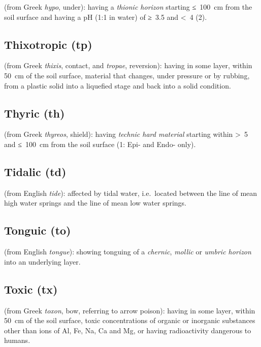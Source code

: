\documentclass[
  letterpaper,
  DIV=11,
  numbers=noendperiod]{scrreprt}
\begin{document}
(from Greek \emph{hypo}, under): having a \emph{thionic horizon}
starting ≤~100~cm from the soil surface and having a pH (1:1 in water)
of ≥~3.5 and \textless~4 (2).

\hypertarget{thixotropic-tp}{%
\subsection{Thixotropic (tp)}\label{thixotropic-tp}}

(from Greek \emph{thixis}, contact, and \emph{tropae}, reversion):
having in some layer, within 50~cm of the soil surface, material that
changes, under pressure or by rubbing, from a plastic solid into a
liquefied stage and back into a solid condition.

\hypertarget{thyric-th}{%
\subsection{Thyric (th)}\label{thyric-th}}

(from Greek \emph{thyreos}, shield): having \emph{technic hard material}
starting within \textgreater~5 and ≤~100~cm from the soil surface (1:
Epi- and Endo- only).

\hypertarget{tidalic-td}{%
\subsection{Tidalic (td)}\label{tidalic-td}}

(from English \emph{tide}): affected by tidal water, i.e.~located
between the line of mean high water springs and the line of mean low
water springs.

\hypertarget{tonguic-to}{%
\subsection{Tonguic (to)}\label{tonguic-to}}

(from English \emph{tongue}): showing tonguing of a \emph{chernic},
\emph{mollic} or \emph{umbric horizon} into an underlying layer.

\hypertarget{toxic-tx}{%
\subsection{Toxic (tx)}\label{toxic-tx}}

(from Greek \emph{toxon}, bow, referring to arrow poison): having in
some layer, within 50~cm of the soil surface, toxic concentrations of
organic or inorganic substances other than ions of Al, Fe, Na, Ca and
Mg, or having radioactivity dangerous to humans.
\end{document}
